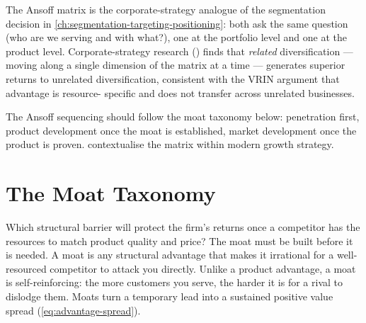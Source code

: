 The Ansoff matrix is the corporate-strategy analogue of the segmentation decision in
\cref{ch:segmentation-targeting-positioning}: both ask the same question (who are we serving
and with what?), one at the portfolio level and one at the product level. Corporate-strategy
research (\parencite{dranove7theconomics}) finds that \emph{related} diversification ---
moving along a single dimension of the matrix at a time --- generates superior returns to
unrelated diversification, consistent with the VRIN argument that advantage is resource-
specific and does not transfer across unrelated businesses.

The Ansoff sequencing should follow the moat taxonomy below: penetration first, product
development once the moat is established, market development once the product is proven.
\textcite{kotler2021} contextualise the matrix within modern growth strategy.

\section{The Moat Taxonomy}\label{sec:moat-taxonomy}

Which structural barrier will protect the firm's returns once a competitor has the resources
to match product quality and price? The moat must be built before it is needed. A moat is
any structural advantage that makes it irrational for a well-resourced competitor to attack
you directly. Unlike a product advantage, a moat is self-reinforcing: the more customers you
serve, the harder it is for a rival to dislodge them. Moats turn a temporary lead into a
sustained positive value spread (\cref{eq:advantage-spread}).

